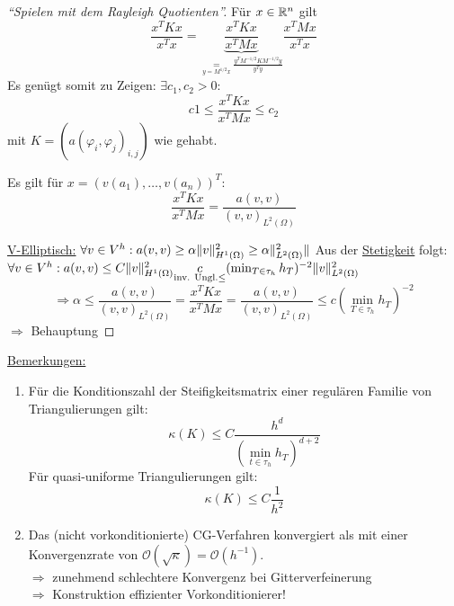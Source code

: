 \begin{proof}[``Spielen mit dem Rayleigh Quotienten'']
  Für $x\in\mathbb{R}^n$ gilt
  \[
    \frac{x^TKx}{x^Tx} = \underbrace{\frac{x^TKx}{x^TMx}}_{\underset{y=M^{1/2}x}{=}\frac{y^TM^{-1/2}KM^{-1/2}y}{y^Ty}} \frac{x^TMx}{x^Tx}
  \]
  Es genügt somit zu Zeigen: $\exists c_1, c_2 >0:$
  \[
    c1 \leq \frac{x^TKx}{x^TMx} \leq c_2
  \]
  mit $K=(a(\varphi_i, \varphi_j)_{i,j})$ wie gehabt. 

  Es gilt für $x=(v(a_1),\ldots, v(a_n))^T$:
  \[
    \frac{x^TKx}{x^TMx} = \frac{a(v,v)}{(v,v)_{L^2(\Omega)}}
  \]

  \underline{V-Elliptisch:} $\forall v\in V^h: a(v,v) \geq \alpha \|v\|^2_{H^1(\Omega)} \geq \alpha \|^2_{L^2(\Omega)}\|$
  Aus der \underline{Stetigkeit} folgt: $\forall v\in V^h: a(v,v) \leq C \|v\|^2_{H^1(\Omega)} \underset{\text{inv. Ungl.}{\leq}} c(\min_{T\in\tau_h} h_T)^{-2} \|v\|^2_{L^2(\Omega)}$
  \[
    \Rightarrow \alpha \leq \frac{a(v,v)}{(v,v)_{L^2(\Omega)}} = \frac{x^TKx}{x^TMx} = \frac{a(v,v)}{(v,v)_{L^2(\Omega)}} \leq c(\min_{T\in\tau_h}h_T)^{-2}
  \]
  $\Rightarrow$ Behauptung
\end{proof}

\underline{Bemerkungen:}
\begin{enumerate}
\item
Für die Konditionszahl der Steifigkeitsmatrix einer regulären Familie von Triangulierungen gilt:
\[ \kappa (K)  \leq C \frac{h^d}{(\min_{t \in \tau_h} h_T)^{d+2}} \]
Für quasi-uniforme Triangulierungen gilt:
\[\kappa (K) \leq C \frac{1}{h^2} \]
\item
Das (nicht vorkonditionierte) CG-Verfahren konvergiert als mit einer Konvergenzrate von $\mathcal{O}(\sqrt{\kappa})=\mathcal{O}(h^{-1})$. \\
$\Rightarrow$ zunehmend schlechtere Konvergenz bei Gitterverfeinerung \\
$\Rightarrow$ Konstruktion effizienter Vorkonditionierer!
\end{enumerate}